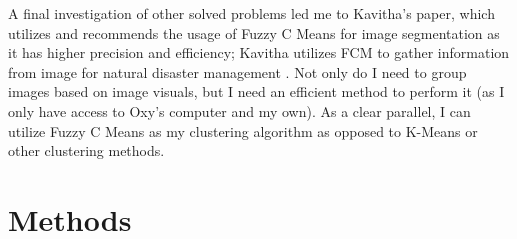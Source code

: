 \documentclass[10pt,twocolumn]{article}
\begin{document}
A final investigation of other solved problems led me to Kavitha's paper, which utilizes and recommends the usage of Fuzzy C Means for image segmentation as it has higher precision and efficiency; Kavitha utilizes FCM to gather information from image for natural disaster management \cite{Kavitha2020}. Not only do I need to group images based on image visuals, but I need an efficient method to perform it (as I only have access to Oxy's computer and my own). As a clear parallel, I can utilize Fuzzy C Means as my clustering algorithm as opposed to K-Means or other clustering methods.


\section {Methods}
\end{document}
